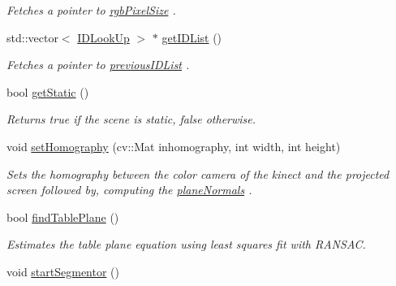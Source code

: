 \begin{DoxyCompactItemize}
\begin{DoxyCompactList}\small\item\em Fetches a pointer to \hyperlink{classpersonal_robotics_1_1_object_segmentor_a7ba1dca4b7433b87ed9028227d0929b3}{rgb\+Pixel\+Size} . \end{DoxyCompactList}\item 
\hypertarget{classpersonal_robotics_1_1_object_segmentor_a60a0e5c08c746773299a400ac8aaec74}{}std\+::vector$<$ \hyperlink{structpersonal_robotics_1_1_i_d_look_up}{I\+D\+Look\+Up} $>$ $\ast$ \hyperlink{classpersonal_robotics_1_1_object_segmentor_a60a0e5c08c746773299a400ac8aaec74}{get\+I\+D\+List} ()\label{classpersonal_robotics_1_1_object_segmentor_a60a0e5c08c746773299a400ac8aaec74}

\begin{DoxyCompactList}\small\item\em Fetches a pointer to \hyperlink{classpersonal_robotics_1_1_object_segmentor_a11e5491339e7f1b543835f10a5daef46}{previous\+I\+D\+List} . \end{DoxyCompactList}\item 
\hypertarget{classpersonal_robotics_1_1_object_segmentor_a412cac1506b709c06548bdfbac1f143d}{}bool \hyperlink{classpersonal_robotics_1_1_object_segmentor_a412cac1506b709c06548bdfbac1f143d}{get\+Static} ()\label{classpersonal_robotics_1_1_object_segmentor_a412cac1506b709c06548bdfbac1f143d}

\begin{DoxyCompactList}\small\item\em Returns true if the scene is static, false otherwise. \end{DoxyCompactList}\item 
void \hyperlink{classpersonal_robotics_1_1_object_segmentor_a44bbf97572b59f392b73fff1fafccc24}{set\+Homography} (cv\+::\+Mat inhomography, int width, int height)
\begin{DoxyCompactList}\small\item\em Sets the homography between the color camera of the kinect and the projected screen followed by, computing the \hyperlink{classpersonal_robotics_1_1_object_segmentor_a2d9b43c69441221cd4b03b61da1ba1ae}{plane\+Normals} . \end{DoxyCompactList}\item 
bool \hyperlink{classpersonal_robotics_1_1_object_segmentor_af4398a1e3f406755ab96787b7d9c50ca}{find\+Table\+Plane} ()
\begin{DoxyCompactList}\small\item\em Estimates the table plane equation using least squares fit with R\+A\+N\+S\+A\+C. \end{DoxyCompactList}\item 
\hypertarget{classpersonal_robotics_1_1_object_segmentor_af02e44cac03022eb39147f63316a2008}{}void \hyperlink{classpersonal_robotics_1_1_object_segmentor_af02e44cac03022eb39147f63316a2008}{start\+Segmentor} ()\label{classpersonal_robotics_1_1_object_segmentor_af02e44cac03022eb39147f63316a2008}


\end{DoxyCompactItemize}
